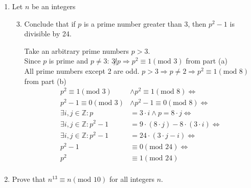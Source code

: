 \documentclass[10pt,\jkfside,a4paper]{article}
\begin{document}
\begin{enumerate}
\item Let $n$ be an integers

\begin{enumerate}

\setcounter{enumii}{2}

\item Conclude that if $p$ is a prime number greater than 3, then $p^2 - 1$ is divisible by 24.

Take an arbitrary prime numbers $p>3$.\\
Since $p$ is prime and $p\neq 3$: $3\not|p \Longrightarrow p^2 \equiv 1 (\text{mod } 3)$ from part (a)\\
All prime numbers except 2 are odd. $p > 3 \Longrightarrow p \neq 2 \Longrightarrow p^2 \equiv 1 (\text{mod } 8)$ from part (b)\\

\begin{equation}
\begin{split}
p^2 \equiv 1 (\text{mod } 3) &\wedge p ^2 \equiv 1 (\text{mod } 8)\Longleftrightarrow\\
p^2 - 1 \equiv 0 (\text{mod } 3) &\wedge p ^2 - 1 \equiv 0 (\text{mod } 8)\Longleftrightarrow\\
\exists i, j \in \mathbb{Z}: p &= 3\cdot i \wedge p = 8\cdot j\Longleftrightarrow\\
\exists i, j \in \mathbb{Z}: p^2 - 1 &= 9\cdot (8\cdot j) - 8\cdot (3\cdot i)\Longleftrightarrow\\
\exists i, j \in \mathbb{Z}: p^2 - 1 &= 24 \cdot (3\cdot j - i)\Longleftrightarrow\\
p^2 - 1 &\equiv 0 (\text{mod } 24)\Longleftrightarrow\\
p^2 &\equiv 1 (\text{mod } 24)\\
\end{split}
\end{equation}

\end{enumerate}

\item Prove that $n^{13} \equiv n(\text{mod } 10)$ for all integers $n$.


\end{enumerate}
\end{document}
